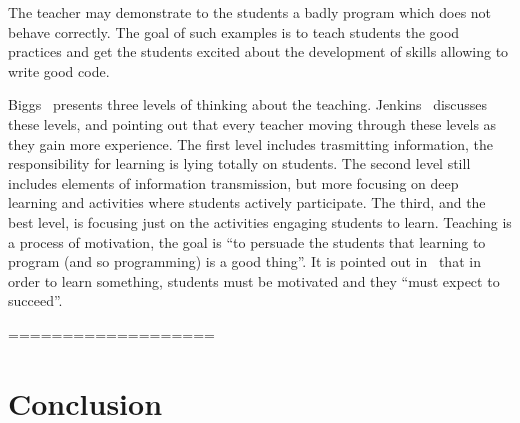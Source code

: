 \documentclass{article}
\begin{document}
The teacher may demonstrate to the students a badly program which does
not behave correctly. The goal of such examples is to teach students
the good practices and get the students excited about the development
of skills allowing to write good code.


Biggs~\cite{biggs2011teaching} presents three levels of thinking about
the teaching.  Jenkins~\cite{journey_Jenkins} discusses these levels,
and pointing out that every teacher moving through these levels as
they gain more experience. The first level includes trasmitting
information, the responsibility for learning is lying totally on
students. The second level still includes elements of information
transmission, but more focusing on deep learning and activities where
students actively participate.  The third, and the best level, is
focusing just on the activities engaging students to learn. Teaching
is a process of motivation, the goal is ``to persuade the students
that learning to program (and so programming) is a good thing''. It is
pointed out in~\cite{journey_Jenkins} that in order to learn
something, students must be motivated and they ``must expect to
succeed''.






===================










\section{Conclusion} %
\label{sec:conclusion}




\end{document}

